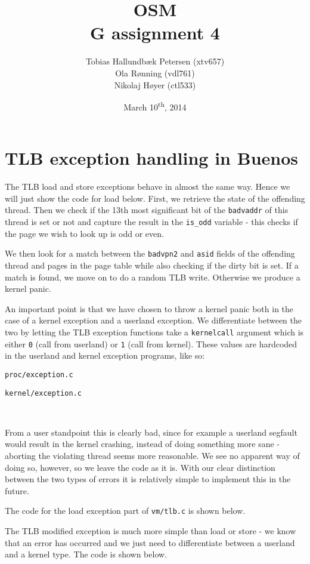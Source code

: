 \documentclass[a4paper,12pt]{article}
\title{OSM\\G assignment 4}
\author{Tobias Hallundbæk Petersen (xtv657)\\Ola Rønning (vdl761)\\Nikolaj Høyer (ctl533)}
\date{March 10\textsuperscript{th}, 2014}
\begin{document}
\maketitle
\tableofcontents
\newpage

\section{TLB exception handling in Buenos}
The TLB load and store exceptions behave in almost the same way. Hence we will just show the code for load below. First, we retrieve the state of the offending thread. Then we check if the 13th most significant bit of the \texttt{badvaddr} of this thread is set or not and capture the result in the \texttt{is\_odd} variable - this checks if the page we wish to look up is odd or even.

We then look for a match between the \texttt{badvpn2} and \texttt{asid} fields of the offending thread and pages in the page table while also checking if the dirty bit is set. If a match is found, we move on to do a random TLB write. Otherwise we produce a kernel panic.

An important point is that we have chosen to throw a kernel panic both in the case of a kernel exception and a userland exception. We differentiate between the two by letting the TLB exception functions take a \texttt{kernelcall} argument which is either \texttt{0} (call from userland) or \texttt{1} (call from kernel). These values are hardcoded in the userland and kernel exception programs, like so:


\texttt{proc/exception.c}


\texttt{kernel/exception.c}

\

From a user standpoint this is clearly bad, since for example a userland segfault would result in the kernel crashing, instead of doing something more sane - aborting the violating thread seems more reasonable. We see no apparent way of doing so, however, so we leave the code as it is. With our clear distinction between the two types of errors it is relatively simple to implement this in the future.

The code for the load exception part of \texttt{vm/tlb.c} is shown below.


The TLB modified exception is much more simple than load or store - we know that an error has occurred and we just need to differentiate between a userland and a kernel type. The code is shown below. 

\end{document}
